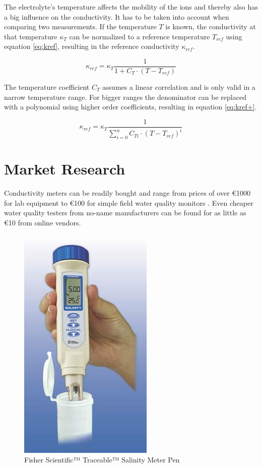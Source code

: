 The electrolyte's temperature affects the mobility of the ions and thereby also has a big influence on the conductivity. It has to be taken into account when comparing two measurements. If the temperature $ T $ is known, the conductivity at that temperature $ \kappa_{T} $ can be normalized to a reference temperature $ T_{ref} $ using equation \eqref{eq:kref}, resulting in the reference conductivity $ \kappa_{ref} $.

\begin{equation}
	\kappa_{ref} = \kappa_{T} \frac{1}{1 + C_{T} \cdot (T - T_{ref})}
\label{eq:kref}
\end{equation}

The temperature coefficient $ C_{T} $ assumes a linear correlation and is only valid in a narrow temperature range. For bigger ranges the denominator can be replaced with a polynomial using higher order coefficients, resulting in equation \eqref{eq:kref+}.

\begin{equation}
	\kappa_{ref} = \kappa_{T} \frac{1}{\sum\limits_{i=0}^n C_{Ti} \cdot (T - T_{ref})^{i}}
\label{eq:kref+}
\end{equation}

\section{Market Research}

Conductivity meters can be readily bought and range from prices of over \euro{1000} for lab equipment \parencite{expcm} to \euro{100} for simple field water quality monitors \parencite{cheapcm}. Even cheaper water quality testers from no-name manufacturers can be found for as little as \euro{10} from online vendors.

\begin{figure}[H]
	\begin{center}
    	\tikzset{external/export next=false}
		\includegraphics[scale=0.6]{images/ccm.jpg}
		\caption{Fisher Scientific™ Traceable™ Salinity Meter Pen \parencite{cheapcm}}
		\label{fig:ccm}
	\end{center}
\end{figure}


